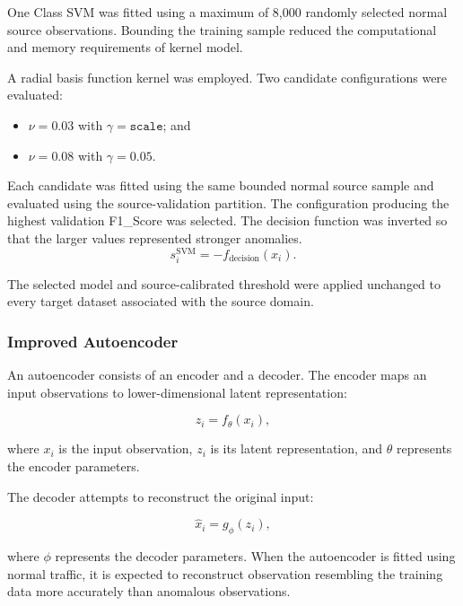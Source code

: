 One Class SVM was fitted using a maximum of 8,000 randomly selected normal source observations. Bounding the training sample reduced the computational and memory requirements of kernel model.

A radial basis function kernel was employed. Two candidate configurations were evaluated:

\begin{itemize}

\item \(\nu=0.03\) with \(\gamma=\texttt{scale}\); and
\item \(\nu=0.08\) with \(\gamma=0.05\).
\end{itemize}

Each candidate was fitted using the same bounded normal source sample and evaluated using the source-validation partition. The configuration producing the highest validation F1\_Score was selected.
The decision function was inverted so that the larger values represented stronger anomalies.
\begin{equation}
       s_i^{\mathrm{SVM}} = 
       -f_{\mathrm{decision}}(x_i).
       \label{eq:svm-anomaly-score}
\end{equation}

The selected model and source-calibrated threshold were applied unchanged to every target dataset associated with the source domain. 

\subsubsection{Improved Autoencoder}
\label{subsec:improved-autoencoder}

An autoencoder consists of an encoder and a decoder. The encoder maps an input observations to lower-dimensional latent representation:

\begin{equation}
       z_i = f_{\theta}(x_i),
       \label{eq:encoder}
\end{equation}

where \(x_i\) is the input observation, \(z_i\) is its latent representation, and \(\theta\) represents the encoder parameters.

The decoder attempts to reconstruct the original input:

\begin{equation}
      \hat{x}_i = g_{\phi}(z_i),
      \label{eq:decoder}
\end{equation}

where \(\phi\) represents the decoder parameters.
When the autoencoder is fitted using normal traffic, it is expected to reconstruct observation resembling the training data more accurately than anomalous observations.

